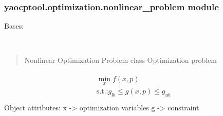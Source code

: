 \documentclass[letterpaper,10pt,english]{sphinxmanual}
\begin{document}
\subsubsection{yaocptool.optimization.nonlinear\_problem module}
\label{\detokenize{yaocptool.optimization:module-yaocptool.optimization.nonlinear_problem}}\label{\detokenize{yaocptool.optimization:yaocptool-optimization-nonlinear-problem-module}}

\begin{fulllineitems}
\label{\detokenize{yaocptool.optimization:yaocptool.optimization.nonlinear_problem.NonlinearOptimizationProblem}}
Bases: {\hyperref[\detokenize{yaocptool.optimization:yaocptool.optimization.abstract_optimization_problem.AbstractOptimizationProblem}]{}}

\begin{fulllineitems}
\label{\detokenize{yaocptool.optimization:yaocptool.optimization.nonlinear_problem.NonlinearOptimizationProblem.__init__}}~\begin{quote}

Nonlinear Optimization Problem class
Optimization problem
\end{quote}
\begin{align*}\!\begin{aligned}
\min_x f(x, p)\\
\textrm{s.t.:} g_{lb} \leq g(x,p) \leq g_{ub}\\
\end{aligned}\end{align*}
Object attributes:
x -\textgreater{} optimization variables
g -\textgreater{} constraint

\end{fulllineitems}


\end{fulllineitems}
\end{document}
